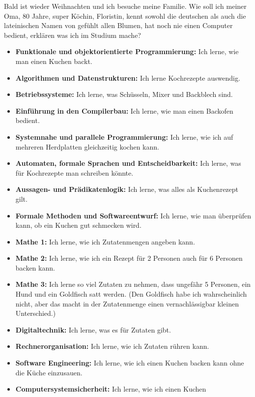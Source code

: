 {Bald ist wieder Weihnachten und ich besuche meine Familie. Wie soll ich
	meiner Oma, 80 Jahre, super Köchin, Floristin, kennt sowohl die
	deutschen als auch die lateinischen Namen von gefühlt allen Blumen, hat
	noch nie einen Computer bedient, erklären was ich im Studium mache?
}
{

	\begin{itemize}
		\item \textbf{Funktionale und objektorientierte Programmierung:} Ich
		    lerne, wie man einen Kuchen backt.
		\item \textbf{Algorithmen und Datenstrukturen:} Ich lerne Kochrezepte
		    auswendig.
		\item \textbf{Betriebssysteme:} Ich lerne, was Schüsseln, Mixer und
		    Backblech sind.
		\item \textbf{Einführung in den Compilerbau:} Ich lerne, wie man einen
		    Backofen bedient.
		\item \textbf{Systemnahe und parallele Programmierung:} Ich lerne, wie
		    ich auf mehreren Herdplatten gleichzeitig kochen kann.
		\item \textbf{Automaten, formale Sprachen und Entscheidbarkeit:} Ich
		    lerne, was für Kochrezepte man schreiben könnte.
		\item \textbf{Aussagen- und Prädikatenlogik:} Ich lerne, was alles als
		    Kuchenrezept gilt.
		\item \textbf{Formale Methoden und Softwareentwurf:} Ich lerne, wie man
		    überprüfen kann, ob ein Kuchen gut schmecken wird.
		\item \textbf{Mathe 1:} Ich lerne, wie ich Zutatenmengen angeben kann.
		\item \textbf{Mathe 2:} Ich lerne, wie ich ein Rezept für 2 Personen auch
		    für 6 Personen backen kann.
		\item \textbf{Mathe 3:} Ich lerne so viel Zutaten zu nehmen, dass
		    ungefähr 5 Personen, ein Hund und ein Goldfisch satt werden. (Den
		    Goldfisch habe ich wahrscheinlich nicht, aber das macht in der
		    Zutatenmenge einen vernachlässigbar kleinen Unterschied.)
		\item \textbf{Digitaltechnik:} Ich lerne, was es für Zutaten gibt.
		\item \textbf{Rechnerorganisation:} Ich lerne, wie ich Zutaten rühren kann.
		\item \textbf{Software Engineering:} Ich lerne, wie ich einen Kuchen backen kann ohne die Küche einzusauen.
		\item \textbf{Computersystemsicherheit:} Ich lerne, wie ich einen Kuchen

\end{itemize}}
